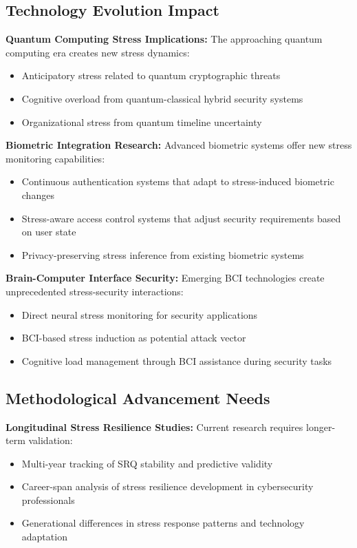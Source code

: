 \documentclass[11pt,a4paper]{article}
\begin{document}
\subsection{Technology Evolution Impact}

\textbf{Quantum Computing Stress Implications:}
The approaching quantum computing era creates new stress dynamics:
\begin{itemize}
\item Anticipatory stress related to quantum cryptographic threats
\item Cognitive overload from quantum-classical hybrid security systems
\item Organizational stress from quantum timeline uncertainty
\end{itemize}

\textbf{Biometric Integration Research:}
Advanced biometric systems offer new stress monitoring capabilities:
\begin{itemize}
\item Continuous authentication systems that adapt to stress-induced biometric changes
\item Stress-aware access control systems that adjust security requirements based on user state
\item Privacy-preserving stress inference from existing biometric systems
\end{itemize}

\textbf{Brain-Computer Interface Security:}
Emerging BCI technologies create unprecedented stress-security interactions:
\begin{itemize}
\item Direct neural stress monitoring for security applications
\item BCI-based stress induction as potential attack vector
\item Cognitive load management through BCI assistance during security tasks
\end{itemize}

\subsection{Methodological Advancement Needs}

\textbf{Longitudinal Stress Resilience Studies:}
Current research requires longer-term validation:
\begin{itemize}
\item Multi-year tracking of SRQ stability and predictive validity
\item Career-span analysis of stress resilience development in cybersecurity professionals
\item Generational differences in stress response patterns and technology adaptation
\end{itemize}
\end{document}
